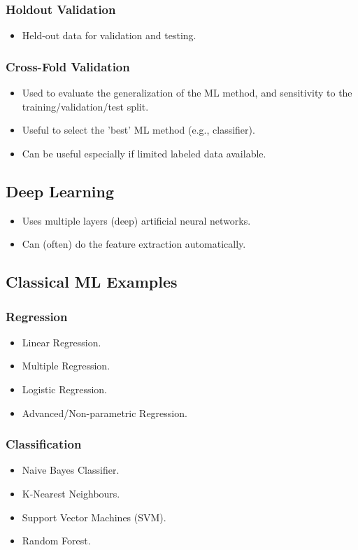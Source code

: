 \documentclass[8pt]{article}
\begin{document}
\subsubsection*{Holdout Validation}
\begin{itemize}
    \item Held-out data for validation and testing.
\end{itemize}

\subsubsection*{Cross-Fold Validation}
\begin{itemize}
    \item Used to evaluate the generalization of the ML method, and sensitivity to the training/validation/test split.
    \item Useful to select the 'best' ML method (e.g., classifier).
    \item Can be useful especially if limited labeled data available.
\end{itemize}

\subsection*{Deep Learning}
\begin{itemize}
    \item Uses multiple layers (deep) artificial neural networks.
    \item Can (often) do the feature extraction automatically.
\end{itemize}

\subsection*{Classical ML Examples}
\subsubsection*{Regression}
\begin{itemize}
    \item Linear Regression.
    \item Multiple Regression.
    \item Logistic Regression.
    \item Advanced/Non-parametric Regression.
\end{itemize}
\subsubsection*{Classification}
\begin{itemize}
    \item Naive Bayes Classifier.
    \item K-Nearest Neighbours.
    \item Support Vector Machines (SVM).
    \item Random Forest.
\end{itemize}
\end{document}
